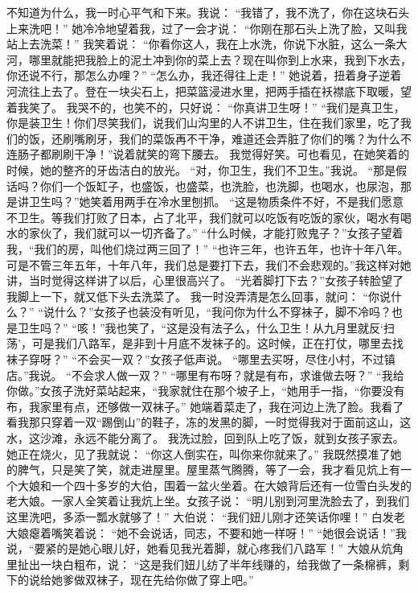 不知道为什么，我一时心平气和下来。我说： 
“我错了，我不洗了，你在这块石头上来洗吧！” 
她冷冷地望着我，过了一会才说： 
“你刚在那石头上洗了脸，又叫我站上去洗菜！” 
我笑着说： 
“你看你这人，我在上水洗，你说下水脏，这么一条大河，哪里就能把我脸上的泥土冲到你的菜上去？现在叫你到上水来，我到下水去，你还说不行，那怎么办哩？” 
“怎么办，我还得往上走！” 
她说着，扭着身子逆着河流往上去了。登在一块尖石上，把菜篮浸进水里，把两手插在袄襟底下取暖，望着我笑了。 
我哭不的，也笑不的，只好说： 
“你真讲卫生呀！” 
“我们是真卫生，你是装卫生！你们尽笑我们，说我们山沟里的人不讲卫生，住在我们家里，吃了我们的饭，还刷嘴刷牙，我们的菜饭再不干净，难道还会弄脏了你们的嘴？为什么不连肠子都刷刷干净！”说着就笑的弯下腰去。 
我觉得好笑。可也看见，在她笑着的时候，她的整齐的牙齿洁白的放光。 
“对，你卫生，我们不卫生。”我说。 
“那是假话吗？你们一个饭缸子，也盛饭，也盛菜，也洗脸，也洗脚，也喝水，也尿泡，那是讲卫生吗？”她笑着用两手在冷水里刨抓。 
“这是物质条件不好，不是我们愿意不卫生。等我们打败了日本，占了北平，我们就可以吃饭有吃饭的家伙，喝水有喝水的家伙了，我们就可以一切齐备了。” 
“什么时候，才能打败鬼子？”女孩子望着我，“我们的房，叫他们烧过两三回了！” 
“也许三年，也许五年，也许十年八年。可是不管三年五年，十年八年，我们总是要打下去，我们不会悲观的。”我这样对她讲，当时觉得这样讲了以后，心里很高兴了。 
“光着脚打下去？”女孩子转脸望了我脚上一下，就又低下头去洗菜了。 
我一时没弄清是怎么回事，就问： 
“你说什么？” 
“说什么？”女孩子也装没有听见，“我问你为什么不穿袜子，脚不冷吗？也是卫生吗？” 
“咳！”我也笑了，“这是没有法子么，什么卫生！从九月里就反‘扫荡’，可是我们八路军，是非到十月底不发袜子的。这时候，正在打仗，哪里去找袜子穿呀？” 
“不会买一双？”女孩子低声说。 
“哪里去买呀，尽住小村，不过镇店。”我说。 
“不会求人做一双？” 
“哪里有布呀？就是有布，求谁做去呀？” 
“我给你做。”女孩子洗好菜站起来，“我家就住在那个坡子上，“她用手一指，“你要没有布，我家里有点，还够做一双袜子。” 
她端着菜走了，我在河边上洗了脸。我看了看我那只穿着一双“踢倒山”的鞋子，冻的发黑的脚，一时觉得我对于面前这山，这水，这沙滩，永远不能分离了。 
我洗过脸，回到队上吃了饭，就到女孩子家去。她正在烧火，见了我就说： 
“你这人倒实在，叫你来你就来了。” 
我既然摸准了她的脾气，只是笑了笑，就走进屋里。屋里蒸气腾腾，等了一会，我才看见炕上有一个大娘和一个四十多岁的大伯，围着一盆火坐着。在大娘背后还有一位雪白头发的老大娘。一家人全笑着让我炕上坐。女孩子说： 
“明儿别到河里洗脸去了，到我们这里洗吧，多添一瓢水就够了！” 
大伯说： 
“我们妞儿刚才还笑话你哩！” 
白发老大娘瘪着嘴笑着说： 
“她不会说话，同志，不要和她一样呀！” 
“她很会说话！”我说，“要紧的是她心眼儿好，她看见我光着脚，就心疼我们八路军！” 
大娘从炕角里扯出一块白粗布，说： 
“这是我们妞儿纺了半年线赚的，给我做了一条棉裤，剩下的说给她爹做双袜子，现在先给你做了穿上吧。” 
